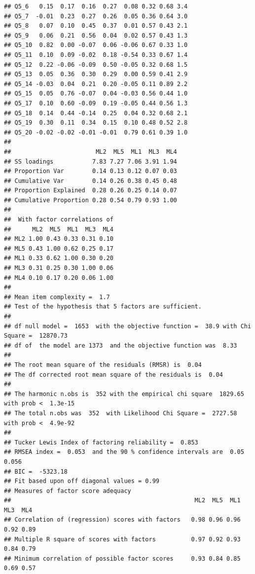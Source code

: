 \documentclass[
  man]{apa6}
\begin{document}
\begin{verbatim}
## Q5_6   0.15  0.17  0.16  0.27  0.08 0.32 0.68 3.4
## Q5_7  -0.01  0.23  0.27  0.26  0.05 0.36 0.64 3.0
## Q5_8   0.07  0.10  0.45  0.37  0.01 0.57 0.43 2.1
## Q5_9   0.06  0.21  0.56  0.04  0.02 0.57 0.43 1.3
## Q5_10  0.82  0.00 -0.07  0.06 -0.06 0.67 0.33 1.0
## Q5_11  0.10  0.09 -0.02  0.18 -0.54 0.33 0.67 1.4
## Q5_12  0.22 -0.06 -0.09  0.50 -0.05 0.32 0.68 1.5
## Q5_13  0.05  0.36  0.30  0.29  0.00 0.59 0.41 2.9
## Q5_14 -0.03  0.04  0.21  0.20 -0.05 0.11 0.89 2.2
## Q5_15  0.05  0.76 -0.07  0.04 -0.03 0.56 0.44 1.0
## Q5_17  0.10  0.60 -0.09  0.19 -0.05 0.44 0.56 1.3
## Q5_18  0.14  0.44 -0.14  0.25  0.04 0.32 0.68 2.1
## Q5_19  0.30  0.11  0.34  0.15  0.10 0.48 0.52 2.8
## Q5_20 -0.02 -0.02 -0.01 -0.01  0.79 0.61 0.39 1.0
## 
##                        ML2  ML5  ML1  ML3  ML4
## SS loadings           7.83 7.27 7.06 3.91 1.94
## Proportion Var        0.14 0.13 0.12 0.07 0.03
## Cumulative Var        0.14 0.26 0.38 0.45 0.48
## Proportion Explained  0.28 0.26 0.25 0.14 0.07
## Cumulative Proportion 0.28 0.54 0.79 0.93 1.00
## 
##  With factor correlations of 
##      ML2  ML5  ML1  ML3  ML4
## ML2 1.00 0.43 0.33 0.31 0.10
## ML5 0.43 1.00 0.62 0.25 0.17
## ML1 0.33 0.62 1.00 0.30 0.20
## ML3 0.31 0.25 0.30 1.00 0.06
## ML4 0.10 0.17 0.20 0.06 1.00
## 
## Mean item complexity =  1.7
## Test of the hypothesis that 5 factors are sufficient.
## 
## df null model =  1653  with the objective function =  38.9 with Chi Square =  12870.73
## df of  the model are 1373  and the objective function was  8.33 
## 
## The root mean square of the residuals (RMSR) is  0.04 
## The df corrected root mean square of the residuals is  0.04 
## 
## The harmonic n.obs is  352 with the empirical chi square  1829.65  with prob <  1.3e-15 
## The total n.obs was  352  with Likelihood Chi Square =  2727.58  with prob <  4.9e-92 
## 
## Tucker Lewis Index of factoring reliability =  0.853
## RMSEA index =  0.053  and the 90 % confidence intervals are  0.05 0.056
## BIC =  -5323.18
## Fit based upon off diagonal values = 0.99
## Measures of factor score adequacy             
##                                                    ML2  ML5  ML1  ML3  ML4
## Correlation of (regression) scores with factors   0.98 0.96 0.96 0.92 0.89
## Multiple R square of scores with factors          0.97 0.92 0.93 0.84 0.79
## Minimum correlation of possible factor scores     0.93 0.84 0.85 0.69 0.57
\end{verbatim}
\end{document}
